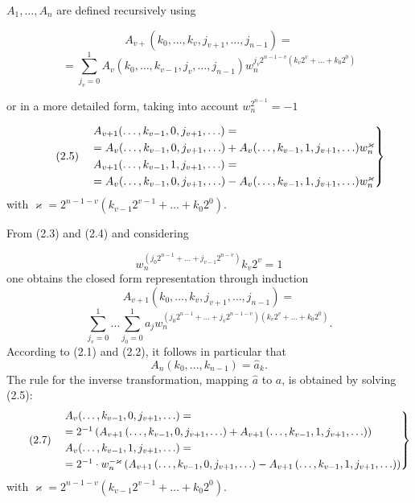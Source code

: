 \documentclass{article}
\begin{document}
$A_1, \ldots, A_n$ are defined recursively using

\[
A_{v + } (k_0, \ldots, k_v, j_{v + 1}, \ldots, j_{n - 1}) =
\]
\[
\tag{2.4}
= \sum_{j_v = 0}^1 A_v (k_0, \ldots, k_{v - 1}, j_v, \ldots, j_{n - 1}) w_n^{j_v 2^{n - 1 - v} (k_v 2^v + \ldots + k_0 2^0)}
\]

or in a more detailed form, taking into account $w_n^{2^{n - 1}} = - 1$

\[
\tag{2.5}
\begin{rcases}
& A_{v + 1}(\ldots, k_{v -1}, 0, j_{v + 1}, \ldots) = \\
&= A_v(\ldots, k_{v - 1}, 0, j_{v + 1}, \ldots) + A_v (\ldots, k_{v - 1}, 1, j_{v + 1}, \ldots) w_n^\varkappa \\
& A_{v + 1}(\ldots, k_{v -1}, 1, j_{v + 1}, \ldots) = \\
&= A_v(\ldots, k_{v - 1}, 0, j_{v + 1}, \ldots) - A_v (\ldots, k_{v - 1}, 1, j_{v + 1}, \ldots) w_n^\varkappa \\
\end{rcases}
\]
with $\varkappa = 2^{n - 1 - v} (k_{v - 1} 2^{v - 1} + \ldots + k_0 2^0)$.

From (2.3) and (2.4) and considering

\[
w_n^{\left(j_0 2^{n - 1} + \ldots + j_{v - 1} 2^{n - v}\right)} k_v 2^v = 1
\]
one obtains the closed form representation through induction
\[
A_{v + 1} \left(k_0, \ldots, k_v, j_{v + 1}, \ldots, j_{n - 1}\right) =
\]
\[
\sum_{j_v = 0}^1 \ldots \sum_{j_0 = 0}^1 a_j w_n^{\left(j_0 2^{n - 1} + \ldots + j_v 2^{n - 1 - v}\right)\left(k_v 2^v + \ldots + k_0 2^0\right)}.
\]
According to (2.1) and (2.2), it follows in particular that
\[
\tag{2.6}
A_n (k_0, \ldots, k_{n - 1}) = \hat{a}_k.
\]
The rule for the inverse transformation, mapping $\hat{a}$ to $a$, is obtained by solving (2.5):
\[
\tag{2.7}
\begin{rcases}
&A_v(\ldots, k_{v - 1}, 0, j_{v + 1}, \ldots) = \\
&= 2^{-1} \left(A_{v + 1}\left(\ldots, k_{v - 1}, 0, j_{v + 1}, \ldots\right) + A_{v + 1}\left(\ldots, k_{v - 1}, 1, j_{v + 1}, \ldots\right)\right) \\
&A_v(\ldots, k_{v - 1}, 1, j_{v + 1}, \ldots) = \\
&= 2^{-1} \cdot w_n^{-\varkappa} \left(A_{v + 1}\left(\ldots, k_{v - 1}, 0, j_{v + 1}, \ldots\right) - A_{v + 1}\left(\ldots, k_{v - 1}, 1, j_{v + 1}, \ldots\right)\right) \\
\end{rcases}
\] with $\varkappa = 2^{n - 1 - v}(k_{v - 1} 2^{v - 1} + \ldots + k_0 2^0)$.
\end{document}
